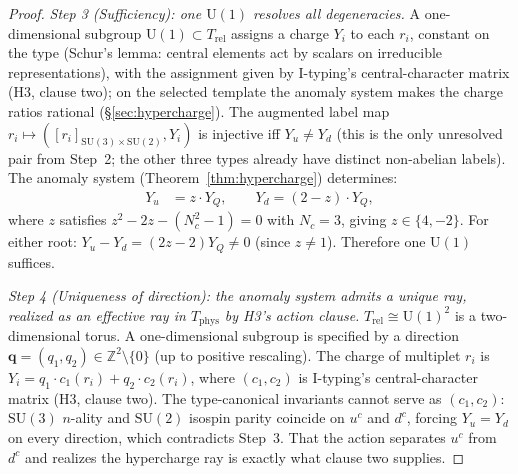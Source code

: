 \documentclass[11pt]{article}
\theoremstyle{definition}
\newcommand{\SU}{\mathrm{SU}}
\newcommand{\U}{\mathrm{U}}
\begin{document}
\begin{proof}
\textit{Step 3 (Sufficiency): one $\U(1)$ resolves all
degeneracies.}\quad
A one-dimensional subgroup $\U(1) \subset T_{\mathrm{rel}}$ assigns a
charge $Y_i$ to each $r_i$, constant on the type (Schur's lemma:
central elements act by scalars on irreducible representations), with
the assignment given by I-typing's central-character matrix (H3,
clause two); on the selected template the anomaly system makes the
charge ratios rational (\S\ref{sec:hypercharge}).  The
augmented label map $r_i \mapsto ([r_i]_{\SU(3) \times \SU(2)},
Y_i)$ is injective iff $Y_u \ne Y_d$ (this is the only
unresolved pair from Step~2; the other three types already have
distinct non-abelian labels).  The anomaly system
(Theorem~\ref{thm:hypercharge}) determines:
\begin{align*}
  Y_u &= z \cdot Y_Q, \qquad Y_d = (2 - z) \cdot Y_Q,
\end{align*}
where $z$ satisfies $z^2 - 2z - (N_c^2 - 1) = 0$ with $N_c = 3$,
giving $z \in \{4, -2\}$.  For either root:
$Y_u - Y_d = (2z - 2) Y_Q \ne 0$ (since $z \ne 1$).
Therefore one $\U(1)$ suffices.

\textit{Step 4 (Uniqueness of direction): the anomaly system admits a
unique ray, realized as an effective ray in $T_{\mathrm{phys}}$ by
H3's action clause.}\quad
$T_{\mathrm{rel}} \cong \mathrm{U}(1)^2$ is a two-dimensional torus.
A one-dimensional subgroup is specified by a direction
$\mathbf{q} = (q_1, q_2) \in \mathbb{Z}^2 \setminus \{0\}$ (up to
positive rescaling).  The charge of multiplet $r_i$ is
$Y_i = q_1 \cdot c_1(r_i) + q_2 \cdot c_2(r_i)$, where
$(c_1, c_2)$ is I-typing's central-character matrix (H3, clause two).
The type-canonical invariants cannot serve as $(c_1, c_2)$: $\SU(3)$
$n$-ality and $\SU(2)$ isospin parity coincide on $u^c$ and $d^c$,
forcing $Y_u = Y_d$ on every direction, which contradicts Step~3.
That the action separates $u^c$ from $d^c$ and realizes the
hypercharge ray is exactly what clause two supplies.


\end{proof}
\end{document}
